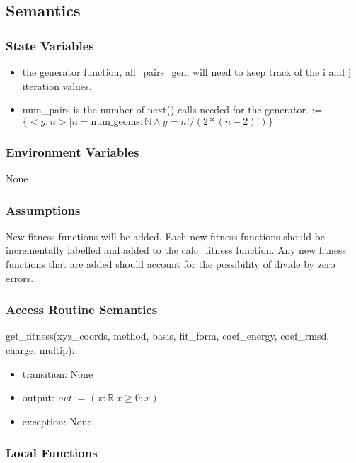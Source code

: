 \documentclass[12pt, titlepage]{article}
\begin{document}
\subsection{Semantics}

\subsubsection{State Variables}

\begin{itemize}
	\item the generator function, all\_pairs\_gen, will need to keep track of 
	the i and j iteration values.
	\item num\_pairs is the number of next() calls needed for the generator. := 
	$\{<y,n> | n = \text{num\_geoms} : \mathbb{N} \land y = n!/(2*(n-2)!) \}$
\end{itemize}

\subsubsection{Environment Variables}

None

\subsubsection{Assumptions}

New fitness functions will be added. Each new fitness functions should be 
incrementally labelled and added to the calc\_fitness function. Any new 
fitness functions that are added should account for the possibility of divide 
by zero errors.

\subsubsection{Access Routine Semantics}

\noindent get\_fitness(xyz\_coords, method, basis, fit\_form, coef\_energy, 
coef\_rmsd, charge, multip):
\begin{itemize}
	\item transition: None
	\item output: \textit{out} := $(x: \mathbb{R}| x \geq 0 : x)$
	\item exception: None
\end{itemize}

\subsubsection{Local Functions}
\end{document}
